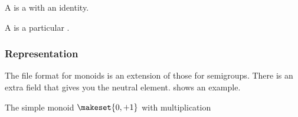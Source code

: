 
A \Monoid is a \Semigroup with an identity.


A \FiniteMonoid is a particular \FiniteSemigroup.


\subsubsection*{Representation}

The file format for monoids is an extension of those for semigroups.
There is an extra field  that gives you the neutral element.
 shows an example.

\begin{marginfigure}%
    \caption{The simple monoid $\makeset{0,+1}$ with multiplication}%
    \label{fig:monoid2}%
\end{marginfigure}%



